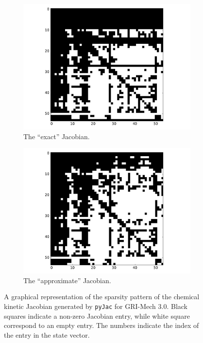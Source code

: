 \documentclass[12pt,number,sort&compress,preprint]{elsarticle}
\begin{document}
\begin{figure}[htb]
  \centering
  \begin{subfigure}[t]{0.45\linewidth}
      \includegraphics[width=\textwidth]{ch4_sparsity_exact.pdf}
      \caption{The ``exact'' Jacobian.}
      \label{F:jac_sparse_exact}
  \end{subfigure}
  \hfill
  \begin{subfigure}[t]{0.45\linewidth}
      \includegraphics[width=\textwidth]{ch4_sparsity_approximate.pdf}
      \caption{The ``approximate'' Jacobian.}
      \label{F:jac_sparse_approx}
  \end{subfigure}
  \caption{A graphical representation of the sparsity pattern of the chemical kinetic Jacobian generated by \texttt{pyJac} for GRI-Mech 3.0.
	   Black squares indicate a non-zero Jacobian entry, while white square correspond to an empty entry.
	   The numbers indicate the index of the entry in the state vector.}
  \label{F:jac_sparsity}
\end{figure}
\end{document}
